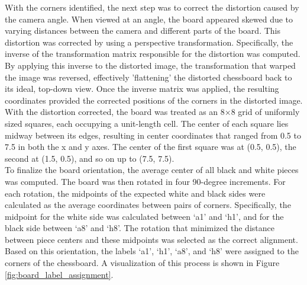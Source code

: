 With the corners identified, the next step was to correct the distortion caused by the camera angle. When viewed at an angle, the board appeared skewed due to varying distances between the camera and different parts of the board. This distortion was corrected by using a perspective transformation. Specifically, the inverse of the transformation matrix responsible for the distortion was computed. By applying this inverse to the distorted image, the transformation that warped the image was reversed, effectively 'flattening' the distorted chessboard back to its ideal, top-down view. Once the inverse matrix was applied, the resulting coordinates provided the corrected positions of the corners in the distorted image. \\

With the distortion corrected, the board was treated as an 8×8 grid of uniformly sized squares, each occupying a unit-length cell. The center of each square lies midway between its edges, resulting in center coordinates that ranged from 0.5 to 7.5 in both the x and y axes. The center of the first square was at (0.5, 0.5), the second at (1.5, 0.5), and so on up to (7.5, 7.5). \\

To finalize the board orientation, the average center of all black and white pieces was computed. The board was then rotated in four 90-degree increments. For each rotation, the midpoints of the expected white and black sides were calculated as the average coordinates between pairs of corners. Specifically, the midpoint for the white side was calculated between ‘a1’ and ‘h1’, and for the black side between ‘a8’ and ‘h8’. The rotation that minimized the distance between piece centers and these midpoints was selected as the correct alignment. Based on this orientation, the labels ‘a1’, ‘h1’, ‘a8’, and ‘h8’ were assigned to the corners of the chessboard. A visualization of this process is shown in Figure \ref{fig:board_label_assignment}.

